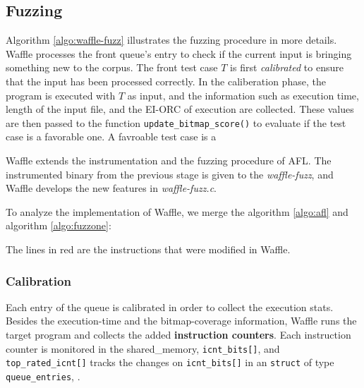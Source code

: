 \subsection{Fuzzing}
\label{sec:3-afl}




Algorithm \ref{algo:waffle-fuzz} illustrates the fuzzing procedure in more details. Waffle processes the front queue's entry to check if the current input is bringing something new to the corpus. The front test case $T$ is first \textit{calibrated} to ensure that the input has been processed correctly. In the caliberation phase, the program is executed with $T$ as input, and the information such as execution time, length of the input file, and the EI-ORC of execution are collected. These values are then passed to the function \texttt{update\_bitmap\_score()} to evaluate if the test case is a favorable one. A favroable test case is a 

% 

Waffle extends the instrumentation and the fuzzing procedure of AFL. The instrumented binary from the previous stage is given to the \textit{waffle-fuzz}, and Waffle develops the new features in \textit{waffle-fuzz.c}.

To analyze the implementation of Waffle, we merge the algorithm \ref{algo:afl} and algorithm \ref{algo:fuzzone}:



The lines in red are the instructions that were modified in Waffle.

\subsubsection*{Calibration}

Each entry of the queue is calibrated in order to collect the execution stats. Besides the execution-time and the bitmap-coverage information, Waffle runs the target program and collects the added \textbf{instruction counters}. Each instruction counter is monitored in the shared\_memory, \texttt{icnt\_bits[]}, and \texttt{top\_rated\_icnt[]} tracks the changes on \texttt{icnt\_bits[]} in an \texttt{struct} of type \texttt{queue\_entries}, .

